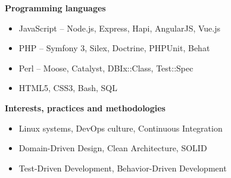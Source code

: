 \noindent
\begin{minipage}[t]{.65\linewidth}
\vspace{0pt}
\textbf{Programming languages}
\begin{itemize}[itemsep=0pt]    %
    \item JavaScript -- Node.js, Express, Hapi, AngularJS, Vue.js
    \item PHP -- Symfony 3, Silex, Doctrine, PHPUnit, Behat %
    \item Perl -- Moose, Catalyst, DBIx::Class, Test::Spec
    \item HTML5, CSS3, Bash, SQL
\end{itemize}

\medskip

\textbf{Interests, practices and methodologies}
\begin{itemize}[itemsep=0pt]
    \item[] \hspace*{-1em} Linux systems, DevOps culture, Continuous Integration
    \item[] \hspace*{-1em} Domain-Driven Design, Clean Architecture, SOLID
    \item[] \hspace*{-1em} Test-Driven Development, Behavior-Driven Development
\end{itemize}

\end{minipage}
%
\hfill
%
